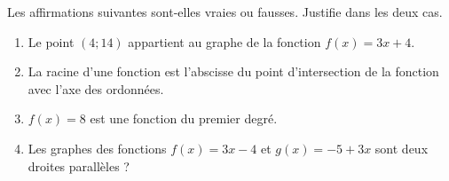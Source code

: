 %
%
    Les affirmations suivantes sont-elles vraies ou fausses. Justifie dans les deux cas.
    \begin{enumerate}
        \item Le point $(4;14)$ appartient au graphe de la fonction $f(x)=3x+4$.
        \item La racine d'une fonction est l'abscisse du point d'intersection de la fonction avec l'axe des ordonnées.
        \item $f(x) = 8$ est une fonction du premier degré.
        \item Les graphes des fonctions $f(x) = 3x - 4$ et $g(x) = -5 + 3x$ sont deux droites parallèles ?
    \end{enumerate}
